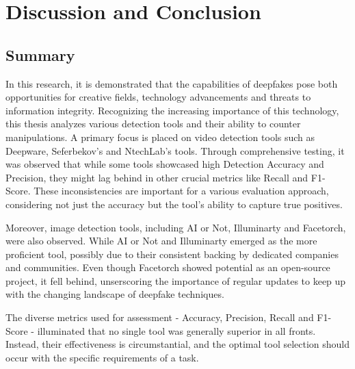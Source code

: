 
\chapter{Discussion and Conclusion}\label{chapter:conclusion}
\section{Summary}
In this research, it is demonstrated that the capabilities of deepfakes pose both
opportunities for creative fields, technology advancements and threats to information
integrity. Recognizing the increasing importance of this technology, this thesis analyzes
various detection tools and their ability to counter manipulations. A primary focus is placed
on video detection tools such as Deepware, Seferbekov's and NtechLab's tools. Through
comprehensive testing, it was observed that while some tools showcased high Detection
Accuracy and Precision, they might lag behind in other crucial metrics like Recall
and F1-Score. These inconsistencies are important for a various evaluation approach,
considering not just the accuracy but the tool's ability to capture true positives.

Moreover, image detection tools, including AI or Not, Illuminarty and Facetorch, were
also observed. While AI or Not and Illuminarty emerged as the more proficient tool,
possibly due to their consistent backing by dedicated companies and communities.
Even though Facetorch showed potential as an open-source project, it fell behind,
unserscoring the importance of regular updates to keep up with the changing landscape
of deepfake techniques.

The diverse metrics used for assessment - Accuracy, Precision, Recall and F1-Score - illuminated
that no single tool was generally superior in all fronts. Instead, their effectiveness is 
circumstantial, and the optimal tool selection should occur with the specific requirements
of a task.

